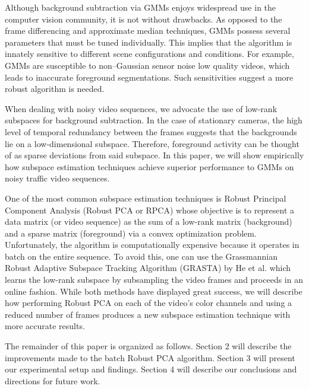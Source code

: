 \documentclass{article}
\begin{document}
Although background subtraction via GMMs enjoys widespread use in the computer vision community, it is not without drawbacks. As opposed to the frame differencing and approximate median techniques, GMMs possess several parameters that must be tuned individually. This implies that the algorithm is innately sensitive to different scene configurations and conditions. For example, GMMs are susceptible to non--Gaussian sensor noise low quality videos, which leads to inaccurate foreground segmentations. Such sensitivities suggest a more robust algorithm is needed.


When dealing with noisy video sequences, we advocate the use of low-rank subspaces for background subtraction.  %
In the case of stationary cameras, the high level of temporal redundancy between the frames suggests that the backgrounds lie on a low-dimensional subspace. Therefore, foreground activity can be thought of as sparse deviations from said subspace. In this paper, we will show empirically how subspace estimation techniques achieve superior performance to GMMs on noisy traffic video sequences. 

One of the most common subspace estimation techniques is Robust Principal Component Analysis (Robust PCA or RPCA) \cite{RPCA09} whose objective is to represent a data matrix (or video sequence) as the sum of a low-rank matrix (background) and a sparse matrix (foreground) via a convex optimization problem. Unfortunately, the algorithm is computationally expensive because it operates in batch on the entire sequence. To avoid this, one can use the Grassmannian Robust Adaptive Subspace Tracking Algorithm (GRASTA) by He et al. \cite{GRASTA12} which learns the low-rank subspace by subsampling the video frames and proceeds in an online fashion. While both methods have displayed great success, we will describe how performing Robust PCA on each of the video's color channels and using a reduced number of frames produces a new subspace estimation technique with more accurate results. 


The remainder of this paper is organized as follows. Section 2 will describe the improvements made to the batch Robust PCA algorithm. Section 3 will present our experimental setup and findings. Section 4 will describe our conclusions and directions for future work.
\end{document}
